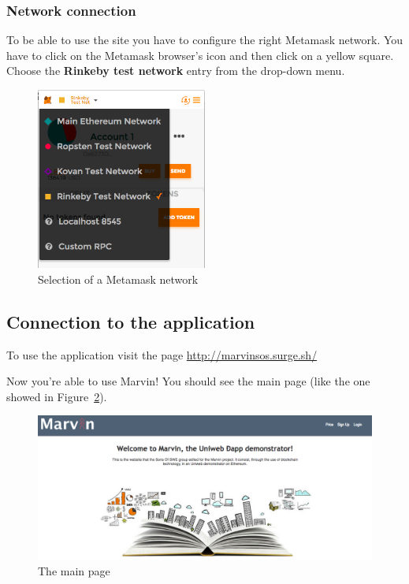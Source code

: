 \subsubsection{Network connection}
To be able to use the site you have to configure the right Metamask network. You have to click on the Metamask browser's icon and then click on a yellow square. Choose the \textbf{Rinkeby test network} entry from the drop-down menu.
\begin{figure}[H]
	\centering
	\includegraphics[width=0.50\textwidth]{img/rinkeby.png}
	\caption{Selection of a Metamask network}
	\label{fig:rinkeby}
\end{figure}

\subsection{Connection to the application}

To use the application visit the page \url{http://marvinsos.surge.sh/}

Now you're able to use Marvin! You should see the \project{} main page (like the one showed in Figure~\ref{fig:main}).
\begin{figure}[H]
	\centering
	\includegraphics[width=1.0\textwidth]{img/main.png}
	\caption{The \project{} main page}
	\label{fig:main}
\end{figure}


